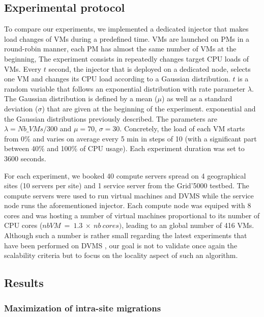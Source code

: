 \subsection{Experimental protocol}
To compare our experiments, we implemented a dedicated injector that makes load
changes of VMs during a predefined time.  VMs are launched on PMs in a
round-robin manner, \ie each PM has almost the same number of VMs at the
beginning, The experiment consists in  repeatedly changes target CPU loads of
VMs.  Every $t$ second, the injector that is deployed on a dedicated node,
selects one VM and changes its CPU load according to a Gaussian distribution.
$t$ is a random variable that follows an exponential distribution with rate
parameter $\lambda$. The Gaussian distribution is defined by a mean ($\mu$) as
well as a standard deviation ($\sigma$) that are given at the beginning of the
experiment. 
exponential and the Gaussian distributions previously described. 
The parameters are $\lambda=\mathit{Nb\_VMs}/300$ and $\mu=70$, $\sigma=30$.
Concretely, the load of each VM starts from 0\% and varies on average every 5
min in steps of 10 (with a significant part between 40\% and 100\% of CPU
usage).   Each experiment duration was set to 3600 seconds.

For each experiment, we booked 40 compute servers spread on 4 geographical sites (10 servers per site)
and 1 service server from the Grid'5000 testbed. The compute servers were used 
to run virtual machines and DVMS while the service node runs the aforementioned
injector.
%
Each compute node was equiped with 8 cores and was hosting a number of virtual
machines proportional to its number of CPU cores
 ($nb VM\ =\ 1.3\ \times\ nb\ cores)$, leading to an global number of 416 VMs. 
Although such a number is rather small regarding the latest experiments that have been performed on DVMS \cite{quesnel:ispa2013}, our goal
is not to validate once again the scalability criteria but to focus on the locality aspect of such an algorithm. 

\subsection{Results}

\subsubsection{Maximization of intra-site migrations}

